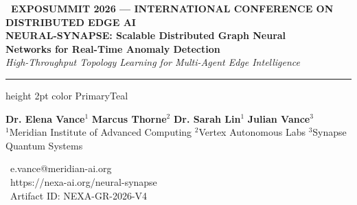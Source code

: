 \documentclass[portrait,a0b,posterscale=1.0]{a0poster}
\begin{document}
\begin{tcolorbox}[
  enhanced,
  colback=NavyDark,
  colframe=NavyDark,
  arc=6mm,
  boxrule=0pt,
  left=12mm,
  right=12mm,
  top=8mm,
  bottom=8mm,
  shadow={0mm}{-3mm}{6mm}{black!20}
]
  \begin{minipage}[c]{0.72\textwidth}
    {\color{PrimaryTeal}\bfseries\Large \faProjectDiagram\ EXPOSUMMIT 2026 --- INTERNATIONAL CONFERENCE ON DISTRIBUTED EDGE AI}\\[2mm]
    {\color{white}\bfseries\VeryHuge NEURAL-SYNAPSE: Scalable Distributed Graph Neural}\\
    {\color{white}\bfseries\VeryHuge Networks for Real-Time Anomaly Detection}\\[3mm]
    {\color{LightSky}\Large\itshape High-Throughput Topology Learning for Multi-Agent Edge Intelligence}
  \end{minipage}%
  \hfill
  \begin{minipage}[c]{0.26\textwidth}
    \centering
  \end{minipage}

  \vspace{5mm}
  \hrule height 2pt color PrimaryTeal
  \vspace{4mm}

  \begin{minipage}[t]{0.68\textwidth}
    {\color{white}\Large \textbf{Dr. Elena Vance}$^1$ \quad \textbf{Marcus Thorne}$^2$ \quad \textbf{Dr. Sarah Lin}$^1$ \quad \textbf{Julian Vance}$^3$}\\[2mm]
    {\color{BorderSlate}\large $^1$Meridian Institute of Advanced Computing \quad $^2$Vertex Autonomous Labs \quad $^3$Synapse Quantum Systems}
  \end{minipage}%
  \hfill
  \begin{minipage}[t]{0.30\textwidth}
    \raggedleft
    {\color{white}\large \faEnvelope\ e.vance@meridian-ai.org}\\[1mm]
    {\color{white}\large \faGlobe\ https://nexa-ai.org/neural-synapse}\\[1mm]
    {\color{LightSky}\large \faServer\ Artifact ID: NEXA-GR-2026-V4}
  \end{minipage}
\end{tcolorbox}
\end{document}
